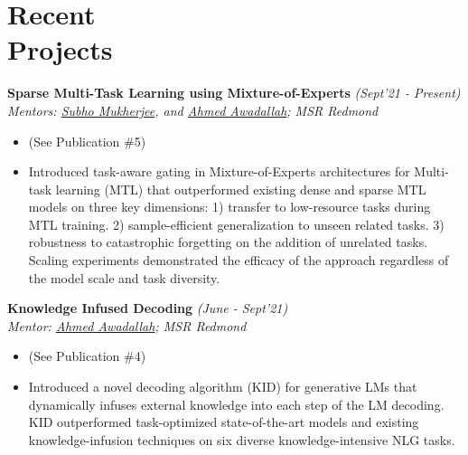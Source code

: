 \section{\mysidestyle Recent\\ Projects}
\vspace{0mm}
\textsf{\textbf{Sparse Multi-Task Learning using Mixture-of-Experts}} \hfill\textit{\small(Sept'21 - Present)}
\\ {\textit{Mentors: \href{https://www.microsoft.com/en-us/research/people/submukhe/}{Subho Mukherjee}, and \href{https://www.microsoft.com/en-us/research/people/hassanam/}{Ahmed Awadallah}; MSR Redmond}}
\normalsize
\begin{itemize}[leftmargin=*]\compresslist
    \item[] (See Publication \#5)\vspace{-1mm}
    \item[] Introduced task-aware gating in Mixture-of-Experts architectures for Multi-task learning (MTL) that outperformed existing dense and sparse MTL models on three key dimensions: 1) transfer to low-resource tasks during MTL training. 2) sample-efficient generalization to unseen related tasks. 3) robustness to catastrophic forgetting on the addition of unrelated tasks. Scaling experiments demonstrated the efficacy of the approach regardless of the model scale and task diversity.
\end{itemize}

\textsf{\textbf{Knowledge Infused Decoding}} \hfill\textit{\small(June - Sept'21)}
\\ {\textit{Mentor: \href{https://www.microsoft.com/en-us/research/people/hassanam/}{Ahmed Awadallah}; MSR Redmond}}
\normalsize
\begin{itemize}[leftmargin=*]\compresslist
\item[] (See Publication \#4)\vspace{-1mm} 
\item[] Introduced a novel decoding algorithm (KID) for generative LMs that dynamically infuses external knowledge into each step of the LM decoding. KID outperformed task-optimized state-of-the-art models and existing knowledge-infusion techniques on six diverse knowledge-intensive NLG tasks. 
\end{itemize}


